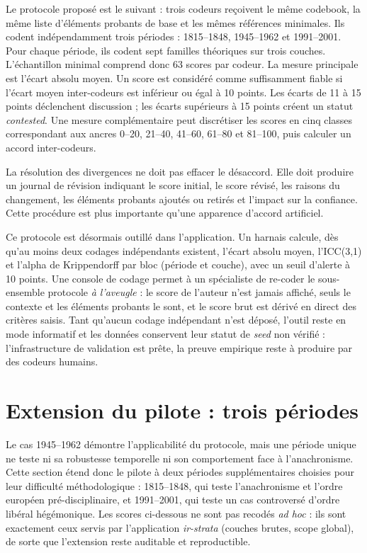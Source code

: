 \documentclass[11pt,a4paper]{article}
\begin{document}
Le protocole proposé est le suivant : trois codeurs reçoivent le même codebook, la même liste d'éléments probants de base et les mêmes références minimales. Ils codent indépendamment trois périodes : 1815--1848, 1945--1962 et 1991--2001. Pour chaque période, ils codent sept familles théoriques sur trois couches. L'échantillon minimal comprend donc 63 scores par codeur. La mesure principale est l'écart absolu moyen. Un score est considéré comme suffisamment fiable si l'écart moyen inter-codeurs est inférieur ou égal à 10 points. Les écarts de 11 à 15 points déclenchent discussion ; les écarts supérieurs à 15 points créent un statut \emph{contested}. Une mesure complémentaire peut discrétiser les scores en cinq classes correspondant aux ancres 0--20, 21--40, 41--60, 61--80 et 81--100, puis calculer un accord inter-codeurs.

La résolution des divergences ne doit pas effacer le désaccord. Elle doit produire un journal de révision indiquant le score initial, le score révisé, les raisons du changement, les éléments probants ajoutés ou retirés et l'impact sur la confiance. Cette procédure est plus importante qu'une apparence d'accord artificiel.

Ce protocole est désormais outillé dans l'application. Un harnais calcule, dès qu'au moins deux codages indépendants existent, l'écart absolu moyen, l'ICC(3,1) et l'alpha de Krippendorff par bloc (période et couche), avec un seuil d'alerte à 10 points. Une console de codage permet à un spécialiste de re-coder le sous-ensemble protocole \emph{à l'aveugle} : le score de l'auteur n'est jamais affiché, seuls le contexte et les éléments probants le sont, et le score brut est dérivé en direct des critères saisis. Tant qu'aucun codage indépendant n'est déposé, l'outil reste en mode informatif et les données conservent leur statut de \emph{seed} non vérifié : l'infrastructure de validation est prête, la preuve empirique reste à produire par des codeurs humains.

\section{Extension du pilote : trois périodes}

Le cas 1945--1962 démontre l'applicabilité du protocole, mais une période unique ne teste ni sa robustesse temporelle ni son comportement face à l'anachronisme. Cette section étend donc le pilote à deux périodes supplémentaires choisies pour leur difficulté méthodologique : 1815--1848, qui teste l'anachronisme et l'ordre européen pré-disciplinaire, et 1991--2001, qui teste un cas controversé d'ordre libéral hégémonique. Les scores ci-dessous ne sont pas recodés \emph{ad hoc} : ils sont exactement ceux servis par l'application \emph{ir-strata} (couches brutes, scope global), de sorte que l'extension reste auditable et reproductible.
\end{document}
